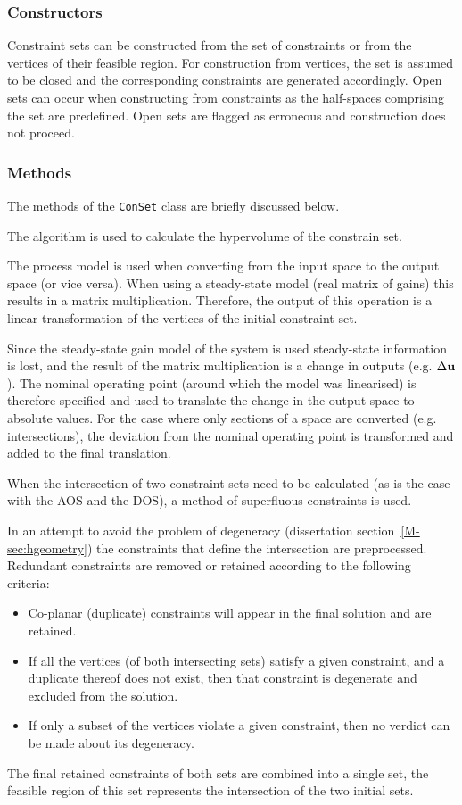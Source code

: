 \subsubsection{Constructors}
Constraint sets can be constructed from the set of constraints or from the vertices of their feasible region.
For construction from vertices, the set is assumed to be closed and the corresponding constraints are generated accordingly.
Open sets can occur when constructing from constraints as the half-spaces comprising the set are predefined.
Open sets are flagged as erroneous and construction does not proceed.

\subsubsection{Methods}
The methods of the \texttt{ConSet} class are briefly discussed below.

The \qhull algorithm is used to calculate the hypervolume of the constrain set.

The process model is used when converting from the input space to the output space (or vice versa).
When using a steady-state model (real matrix of gains) this results in a matrix multiplication.
Therefore, the output of this operation is a linear transformation of the vertices of the initial constraint set.

Since the steady-state gain model of the system is used steady-state information is lost, and the result of the matrix multiplication is a change in outputs (e.g. $\Delta{\bf {u}}$).
The nominal operating point (around which the model was linearised) is therefore specified and used to translate the change in the output space to absolute values.
For the case where only sections of a space are converted (e.g. intersections), the deviation from the nominal operating point is transformed and added to the final translation.  

When the intersection of two constraint sets need to be calculated (as is the case with the AOS and the DOS), a method of superfluous constraints is used.

In an attempt to avoid the problem of degeneracy (dissertation section~\ref{M-sec:hgeometry}) the constraints that define the intersection are preprocessed.
Redundant constraints are removed or retained according to the following criteria:
\begin{itemize}
\item Co-planar (duplicate) constraints will appear in the final solution and are retained.
\item If all the vertices (of both intersecting sets) satisfy a given constraint, and a duplicate thereof does not exist, then that constraint is degenerate and excluded from the solution.
\item If only a subset of the vertices violate a given constraint, then no verdict can be made about its degeneracy.
\end{itemize}
The final retained constraints of both sets are combined into a single set, the feasible region of this set represents the intersection of the two initial sets.

